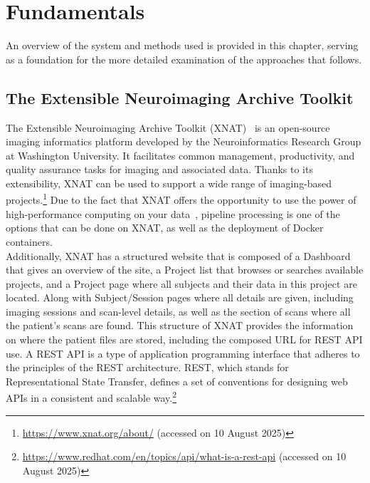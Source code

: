 
\chapter{Fundamentals}

An overview of the system and methods used is provided in this chapter, serving as a foundation for the more detailed examination of the approaches that follows. 

\section{The Extensible Neuroimaging Archive Toolkit}
The Extensible Neuroimaging Archive Toolkit (XNAT)~\cite{marcus_extensible_2007} is an open-source imaging informatics platform developed by the Neuroinformatics Research Group at Washington University. It facilitates common management, productivity, and quality assurance tasks for imaging and associated data. Thanks to its extensibility, XNAT can be used to support a wide range of imaging-based projects.\footnote{\url{https://www.xnat.org/about/} (accessed on 10 August 2025)} Due to the fact that XNAT offers the opportunity to use the power of high-performance computing on your data~\cite{zaschke_extending_2024}, 
pipeline processing is one of the options that can be done on XNAT, as well as the deployment of Docker containers.
\\
Additionally, XNAT has a structured website that is composed of a Dashboard that gives an overview of the site, a Project list that browses or searches available projects, and a Project page where all subjects and their data in this project are located. Along with Subject/Session pages where all details are given, including imaging sessions and scan-level details, as well as the section of scans where all the patient’s scans are found. 
This structure of XNAT provides the information on where the patient files are stored, including the composed URL for REST API use. A REST API is a type of application programming interface that adheres to the principles of the REST architecture. REST, which stands for Representational State Transfer, defines a set of conventions for designing web APIs in a consistent and scalable way.\footnote{\url{https://www.redhat.com/en/topics/api/what-is-a-rest-api} (accessed on 10 August 2025)}
\\
